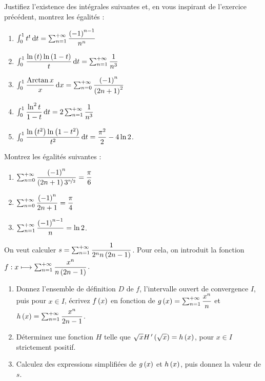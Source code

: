 \begin{exoss}
Justifiez l'existence des intégrales suivantes et, en vous inspirant de l'exercice précédent, montrez les égalités :

\begin{enumerate}
    \item \(\int_0^1t^t\odif{t}=\sum_{n=1}^{\pinf}\dfrac{\paren{-1}^{n-1}}{n^n}\) \\
    \item \(\int_0^1\dfrac{\ln\paren{t}\ln\paren{1-t}}{t}\odif{t}=\sum_{n=1}^{\pinf}\dfrac{1}{n^3}\) \\
    \item \(\int_0^1\dfrac{\Arctan x}{x}\odif{x}=\sum_{n=0}^{\pinf}\dfrac{\paren{-1}^n}{\paren{2n+1}^2}\) \\
    \item \(\int_0^1\dfrac{\ln^2t}{1-t}\odif{t}=2\sum_{n=1}^{\pinf}\dfrac{1}{n^3}\) \\
    \item \(\int_0^1\dfrac{\ln\paren{t^2}\ln\paren{1-t^2}}{t^2}\odif{t}=\dfrac{\pi^2}{2}-4\ln 2\).
\end{enumerate}
\end{exoss}

\begin{exoss}
Montrez les égalités suivantes :

\begin{enumerate}
    \item \(\sum_{n=0}^{+\infty}\dfrac{\left(-1\right)^n}{\left(2n+1\right)3^{\nicefrac{n}{2}}}=\dfrac{\pi}{6}\) \\
    \item \(\sum_{n=0}^{+\infty}\dfrac{\left(-1\right)^n}{2n+1}=\dfrac{\pi}{4}\) \\
    \item \(\sum_{n=1}^{+\infty}\dfrac{\left(-1\right)^{n-1}}{n}=\ln 2\).
\end{enumerate}
\end{exoss}

\begin{exoss}
On veut calculer \(s=\sum_{n=1}^{+\infty}\dfrac{1}{2^nn\left(2n-1\right)}\). Pour cela, on introduit la fonction \(f:x\longmapsto\sum_{n=1}^{+\infty}\dfrac{x^n}{n\left(2n-1\right)}\).

\begin{enumerate}
    \item Donnez l'ensemble de définition \(D\) de \(f\), l'intervalle ouvert de convergence \(I\), puis pour \(x\in I\), écrivez \(f\left(x\right)\) en fonction de \(g\left(x\right)=\sum_{n=1}^{+\infty}\dfrac{x^n}{n}\) et \(h\left(x\right)=\sum_{n=1}^{+\infty}\dfrac{x^n}{2n-1}\). \\
    \item Déterminez une fonction \(H\) telle que \(\sqrt{x}H^{\,\prime}\left(\sqrt{x}\right)=h\left(x\right)\), pour \(x\in I\) strictement positif. \\
    \item Calculez des expressions simplifiées de \(g\left(x\right)\) et \(h\left(x\right)\), puis donnez la valeur de \(s\).
\end{enumerate}
\end{exoss}


